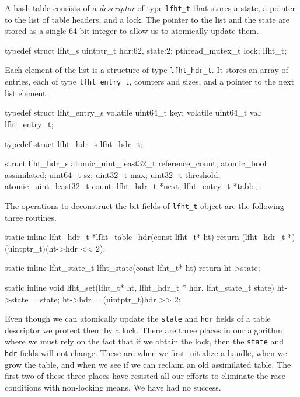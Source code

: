 A hash
table consists of a {\em descriptor\/} of type \texttt{lfht\_t} that
stores a state, a pointer to the list of table headers, and a lock.
The pointer to the list and the state are stored as a single 64 bit integer
to allow us to atomically update them.
\begin{center}
\begin{clisting}
typedef struct lfht_s {
  uintptr_t hdr:62, state:2;
  pthread_mutex_t lock;
} lfht_t;
\end{clisting}
\end{center}
Each
element of the list is a structure of type \texttt{lfht\_hdr\_t}. It
stores an array of entries, each of type \texttt{lfht\_entry\_t}, counters and sizes, and a pointer to the
next list element.
\begin{center}
\begin{clisting}
typedef struct lfht_entry_s {
  volatile uint64_t  key;
  volatile uint64_t  val;
} lfht_entry_t;

typedef struct lfht_hdr_s lfht_hdr_t;

struct lfht_hdr_s {
  atomic_uint_least32_t reference_count;
  atomic_bool assimilated;
  uint64_t sz;
  uint32_t max;
  uint32_t threshold;
  atomic_uint_least32_t count;
  lfht_hdr_t *next;
  lfht_entry_t *table;
};
\end{clisting}
\end{center}

The operations to deconstruct the bit fields of \texttt{lfht\_t} object are the following three
routines.
\begin{center}
\begin{clisting}
static inline lfht_hdr_t *lfht_table_hdr(const lfht_t* ht){
  return (lfht_hdr_t *)(uintptr_t)(ht->hdr << 2);
}

static inline lfht_state_t lfht_state(const lfht_t* ht){
  return ht->state;
}

static inline void lfht_set(lfht_t* ht, lfht_hdr_t * hdr, lfht_state_t state){
  ht->state = state;
  ht->hdr = (uintptr_t)hdr >> 2;
}
\end{clisting}
\end{center}


Even though we can atomically update the \texttt{state} and
\texttt{hdr} fields of a table descriptor we protect them by a lock. There are three
places in our algorithm where we must rely on the fact that if we obtain
the lock, then the \texttt{state} and \texttt{hdr} fields will not
change.  These are when we first initialize a handle, when we grow the
table, and when we see if we can reclaim an old assimilated table.
The first two of these three places have resisted all our efforts to eliminate the race conditions
with non-locking means. We have had no success.


